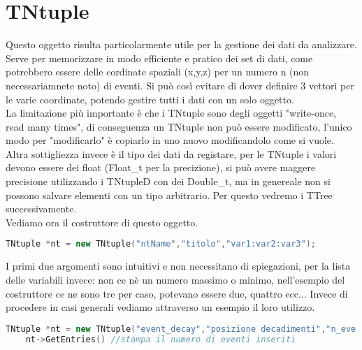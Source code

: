 \section{TNtuple}
Questo oggetto risulta particolarmente utile per la gestione dei dati da analizzare. Serve per memorizzare in modo efficiente e pratico dei set di dati, come potrebbero essere delle cordinate spaziali (x,y,z) per un numero n (non necessariamnete noto) di eventi. Si può così evitare di dover definire 3 vettori per le varie coordinate, potendo gestire tutti i dati con un solo oggetto.\\
La limitazione più importante è che i TNtuple sono degli oggetti "write-once, read many times", di conseguenza un TNtuple non può essere modificato, l'unico modo per "modificarlo" è copiarlo in uno nuovo modificandolo come si vuole. Altra sottigliezza invece è il tipo dei dati da registare, per le TNtuple i valori devono essere dei float (Float\_t per la precizione), si può avere maggere precisione utilizzando i TNtupleD con dei Double\_t, ma in genereale non si possono salvare elementi con un tipo arbitrario. Per questo vedremo i TTree successivamente.\\
Vediamo ora il costruttore di questo oggetto.
\begin{lstlisting}[language=C++,label={cod1},mathescape=true,breaklines=true]
	TNtuple *nt = new TNtuple("ntName","titolo","var1:var2:var3");
\end{lstlisting}
I primi due argomenti sono intuitivi e non necessitano di spiegazioni, per la lista delle variabili invece: non ce nè un numero massimo o minimo, nell'esempio del costruttore ce ne sono tre per caso, potevano essere due, quattro ecc... Invece di procedere in casi generali vediamo attraverso un esempio il loro utilizzo.
\begin{lstlisting}[language=C++,label={cod1},mathescape=true,breaklines=true]
	TNtuple *nt = new TNtuple("event_decay","posizione decadimenti","n_eve:x:y:z"); //costruttore
	nt->GetEntries() //stampa il numero di eventi inseriti
\end{lstlisting}


